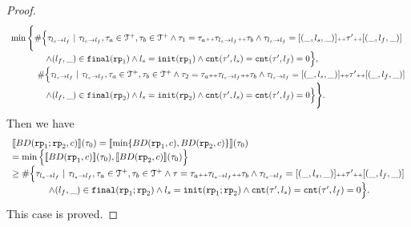 \begin{proof}
\[\begin{array}{l}
      \min \Bigg\{ \#
      \Big\{\mathtt{\tau}_{l_s \to l_f} ~\vert~ \mathtt{\tau}_{l_s \to l_f}, \mathtt{\tau}_a \in \mathcal{T}^{+}, \mathtt{\tau}_b \in \mathcal{T}^{+}
      \land \mathtt{\tau}_1 = \mathtt{\tau}_a {\scriptscriptstyle ++} \mathtt{\tau}_{l_s \to l_f} {\scriptscriptstyle ++} \mathtt{\tau}_b
      \land \mathtt{\tau}_{l_s \to l_f} = [(\_, l_s, \_)] {\scriptscriptstyle ++} \mathtt{\tau}' {\scriptscriptstyle ++} [(\_, l_f, \_)]
        \\ \qquad \qquad
      \land (l_{f}, \_) \in \mathtt{final}(\mathtt{rp}_1)
      \land l_s = \mathtt{init}(\mathtt{rp}_1)
      \land \mathtt{cnt}(\mathtt{\tau}', l_s) = \mathtt{cnt}(\mathtt{\tau}', l_f) = 0 
      \Big\},
      \\ \qquad \quad
      \#
      \Big\{\mathtt{\tau}_{l_s \to l_f} ~\vert~ \mathtt{\tau}_{l_s \to l_f}, \mathtt{\tau}_a \in \mathcal{T}^{+}, \mathtt{\tau}_b \in \mathcal{T}^{+}
      \land \mathtt{\tau}_2 = \mathtt{\tau}_a {\scriptscriptstyle ++} \mathtt{\tau}_{l_s \to l_f} {\scriptscriptstyle ++} \mathtt{\tau}_b
      \land \mathtt{\tau}_{l_s \to l_f} = [(\_, l_s, \_)] {\scriptscriptstyle ++} \mathtt{\tau}' {\scriptscriptstyle ++} [(\_, l_f, \_)]
       \\ \qquad \qquad
     \land (l_{f}, \_) \in \mathtt{final}(\mathtt{rp}_2)
     \land l_s = \mathtt{init}(\mathtt{rp}_2)
     \land \mathtt{cnt}(\mathtt{\tau}', l_s) = \mathtt{cnt}(\mathtt{\tau}', l_f) = 0 
     \Big\} 
     \Bigg\}.
      \end{array}
    \]
    Then we have
    \[
      \begin{array}{l}
      \llbracket BD(\mathtt{rp}_1; \mathtt{rp}_2, c) \rrbracket(\mathtt{\tau}_0) =
      \llbracket \min \{ BD(\mathtt{rp}_1, c), BD(\mathtt{rp}_2, c) \} \rrbracket(\mathtt{\tau}_0)
      \\
      = \min \Big\{ \llbracket BD(\mathtt{rp}_1, c) \rrbracket(\mathtt{\tau}_0), \llbracket BD(\mathtt{rp}_2, c) \rrbracket(\mathtt{\tau}_0) \Big\}
      \\
      \geq
      \# \Big\{\mathtt{\tau}_{l_s \to l_f} ~\vert~ \mathtt{\tau}_{l_s \to l_f}, \mathtt{\tau}_a \in \mathcal{T}^{+}, \mathtt{\tau}_b \in \mathcal{T}^{+}
      \land \mathtt{\tau} = \mathtt{\tau}_a {\scriptscriptstyle ++} \mathtt{\tau}_{l_s \to l_f} {\scriptscriptstyle ++} \mathtt{\tau}_b
      \land \mathtt{\tau}_{l_s \to l_f} = [(\_, l_s, \_)] {\scriptscriptstyle ++} \mathtt{\tau}' {\scriptscriptstyle ++} [(\_, l_f, \_)]
      \\ \qquad \qquad
      \land (l_{f}, \_) \in \mathtt{final}(\mathtt{rp}_1; \mathtt{rp}_2)
      \land l_s = \mathtt{init}(\mathtt{rp}_1; \mathtt{rp}_2)
      \land \mathtt{cnt}(\mathtt{\tau}', l_s) = \mathtt{cnt}(\mathtt{\tau}', l_f) = 0 
      \Big\}.
        \end{array}
    \]
This case is proved.

\end{proof}
